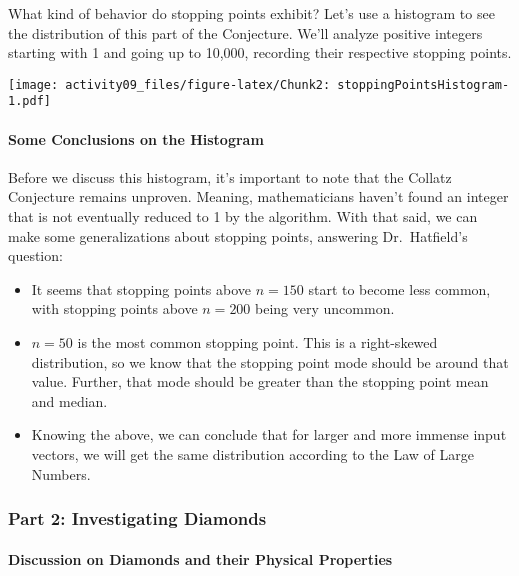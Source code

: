 \documentclass[
]{article}
\begin{document}
What kind of behavior do stopping points exhibit? Let's use a histogram
to see the distribution of this part of the Conjecture. We'll analyze
positive integers starting with 1 and going up to 10,000, recording
their respective stopping points.

\texttt{[image: activity09\_files/figure-latex/Chunk2: stoppingPointsHistogram-1.pdf]}

\hypertarget{some-conclusions-on-the-histogram}{%
\paragraph{Some Conclusions on the
Histogram}\label{some-conclusions-on-the-histogram}}

Before we discuss this histogram, it's important to note that the
Collatz Conjecture remains unproven. Meaning, mathematicians haven't
found an integer that is not eventually reduced to 1 by the algorithm.
With that said, we can make some generalizations about stopping points,
answering Dr.~Hatfield's question:

\begin{itemize}
\item
  It seems that stopping points above \(n = 150\) start to become less
  common, with stopping points above \(n = 200\) being very uncommon.
\item
  \(n = 50\) is the most common stopping point. This is a right-skewed
  distribution, so we know that the stopping point mode should be around
  that value. Further, that mode should be greater than the stopping
  point mean and median.
\item
  Knowing the above, we can conclude that for larger and more immense
  input vectors, we will get the same distribution according to the Law
  of Large Numbers.
\end{itemize}

\hypertarget{part-2-investigating-diamonds}{%
\subsubsection{Part 2: Investigating
Diamonds}\label{part-2-investigating-diamonds}}

\hypertarget{discussion-on-diamonds-and-their-physical-properties}{%
\paragraph{Discussion on Diamonds and their Physical
Properties}\label{discussion-on-diamonds-and-their-physical-properties}}
\end{document}
